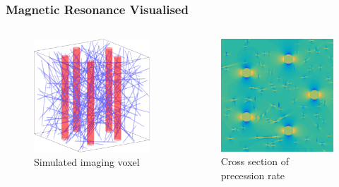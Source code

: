 \begin{frame}
\frametitle{Magnetic Resonance Visualised}
\centering
\begin{columns}
\begin{column}{.5\textwidth}
\begin{figure}
  \includegraphics[height=0.8\textwidth]{figures/voxelgeo}
  \caption{Simulated imaging voxel}
\end{figure}
\end{column}
\begin{column}{.5\textwidth}
\begin{figure}
  \includegraphics[height=0.8\textwidth]{figures/domega}
  \caption{Cross section of precession rate}
\end{figure}
\end{column}
\end{columns}
\end{frame}

